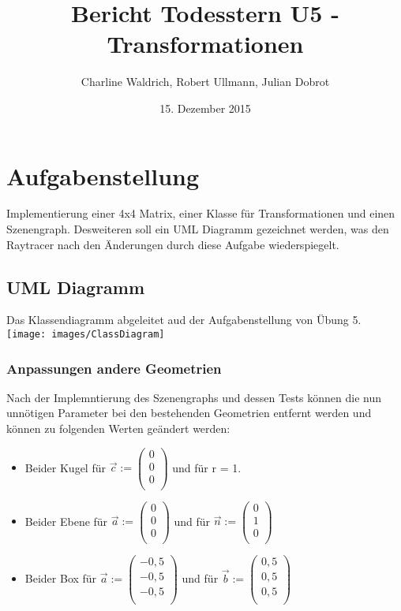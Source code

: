 \documentclass[14pt]{extarticle}
\title{Bericht Todesstern U5 - Transformationen}
\author{Charline Waldrich, Robert Ullmann, Julian Dobrot}
\date{15. Dezember 2015}
\begin{document}
\maketitle
\pagebreak
\tableofcontents


\section{Aufgabenstellung}
Implementierung einer 4x4 Matrix, einer Klasse für Transformationen und einen Szenengraph. Desweiteren soll ein UML Diagramm gezeichnet werden, was den Raytracer nach den Änderungen durch diese Aufgabe wiederspiegelt.
\subsection{UML Diagramm}
Das Klassendiagramm abgeleitet aud der Aufgabenstellung von Übung 5.\\
\texttt{[image: images/ClassDiagram]}\\


\subsubsection{Anpassungen andere Geometrien}
Nach der Implemntierung des Szenengraphs und dessen Tests können die nun unnötigen Parameter bei den bestehenden Geometrien entfernt werden und können zu folgenden Werten geändert werden:

\begin{itemize} 
\item Beider Kugel für $\vec{c} :=\begin{pmatrix} 0 \\ 0\\ 0 \\\end{pmatrix} $  und für r = 1.
\item Beider Ebene für $\vec{a} :=\begin{pmatrix} 0 \\ 0\\ 0 \\\end{pmatrix} $ und für 
$\vec{n} :=\begin{pmatrix} 0 \\ 1\\ 0 \\\end{pmatrix} $
\item Beider Box für $\vec{a} :=\begin{pmatrix} -0,5\\ -0,5\\ -0,5 \\\end{pmatrix} $ und für
$\vec{b} :=\begin{pmatrix} 0,5 \\ 0,5\\ 0,5 \\\end{pmatrix} $
\end{itemize}
\end{document}
